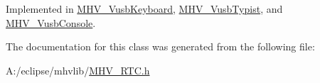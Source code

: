 \-Implemented in \hyperlink{class_m_h_v___vusb_keyboard_a3f320339da1b79feb100374bbf688900}{\-M\-H\-V\-\_\-\-Vusb\-Keyboard}, \hyperlink{class_m_h_v___vusb_typist_a2c75524f75cd93876648da3ebd90b529}{\-M\-H\-V\-\_\-\-Vusb\-Typist}, and \hyperlink{class_m_h_v___vusb_console_a686f9fdcdf6884351996e9adc1fa6114}{\-M\-H\-V\-\_\-\-Vusb\-Console}.



\-The documentation for this class was generated from the following file\-:\begin{DoxyCompactItemize}
\item 
\-A\-:/eclipse/mhvlib/\hyperlink{_m_h_v___r_t_c_8h}{\-M\-H\-V\-\_\-\-R\-T\-C.\-h}\end{DoxyCompactItemize}
